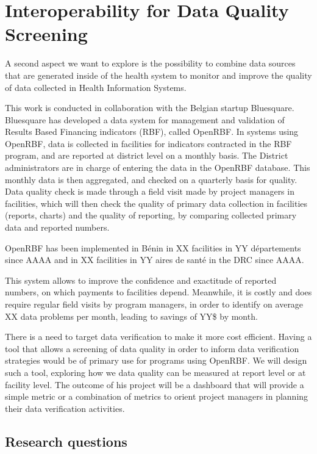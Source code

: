 \section{Interoperability for Data Quality Screening}

A second aspect we want to explore is the possibility to combine data sources that are generated inside of the health system to monitor and improve the quality of data collected in Health Information Systems.


This work is conducted in collaboration with the Belgian startup Bluesquare. Bluesquare has developed a data system for management and validation of Results Based Financing indicators (RBF), called OpenRBF.  In systems using OpenRBF, data is collected in facilities for indicators contracted in the RBF program, and are reported at district level on a monthly basis. The District administrators are in charge of entering the data in the OpenRBF database. This monthly data is then aggregated, and checked on a quarterly basis for quality. Data quality check is made through a field visit made by project managers in facilities, which will then check the quality of primary data collection in facilities (reports, charts) and the quality of reporting, by comparing collected primary data and reported numbers.

OpenRBF has been implemented in Bénin in XX facilities in YY départements since AAAA and in XX facilities in YY aires de santé in the DRC since AAAA.

This system allows to improve the confidence and exactitude of reported numbers, on which payments to facilities depend. Meanwhile, it is costly and does require regular field visits by program managers, in order to identify on average XX data problems per month, leading to savings of YY\$ by month.

There is a need to target data verification to make it more cost efficient. Having a tool that allows a screening of data quality in order to inform data verification strategies would be of primary use for programs using OpenRBF. We will design such a tool, exploring how we data quality can be measured at report level or at facility level. The outcome of his project will be a dashboard that will provide a simple metric or a combination of metrics to orient project managers in planning their data verification activities.

\subsection{Research questions}

